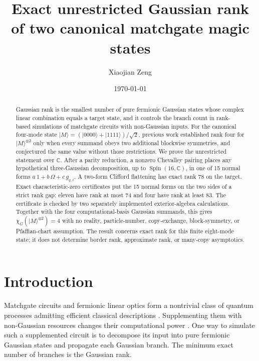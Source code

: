\documentclass[aps,pra,reprint,groupedaddress,nofootinbib,longbibliography]{revtex4-2}
\newcommand{\ket}[1]{\lvert #1\rangle}
\newcommand{\C}{\mathbb{C}}
\begin{document}
\title{Exact unrestricted Gaussian rank of two canonical matchgate magic states}

\author{Xiaojian Zeng}

\date{\today}

\begin{abstract}
Gaussian rank is the smallest number of pure fermionic Gaussian states whose
complex linear combination equals a target state, and it controls the branch
count in rank-based simulations of matchgate circuits with non-Gaussian inputs.
For the canonical four-mode state
$\ket{M}=(\ket{0000}+\ket{1111})/\sqrt{2}$, previous work established rank four
for $\ket{M}^{\otimes 2}$ only when every summand obeys two additional blockwise
symmetries, and conjectured the same value without those restrictions.  We prove
the unrestricted statement over $\C$.  After a parity reduction, a nonzero
Chevalley pairing places any hypothetical three-Gaussian decomposition, up to
$\operatorname{Spin}(16,\C)$, in one of 15 normal forms
$a\,1+b\,\Omega+c\,g_{q,i}$.  A two-form Clifford flattening has exact rank 78
on the target.  Exact characteristic-zero certificates put the 15 normal forms
on the two sides of a strict rank gap: eleven have rank at most 74 and four have
rank at least 83.  The certificate is checked by two separately implemented
exterior-algebra calculations.  Together with the four computational-basis
Gaussian summands, this gives $\chi_G(\ket{M}^{\otimes2})=4$ with no reality,
particle-number, copy-exchange, block-symmetry, or Pfaffian-chart assumption.
The result concerns exact rank for this finite eight-mode state; it does not
determine border rank, approximate rank, or many-copy asymptotics.
\end{abstract}

\maketitle

\section{Introduction}

Matchgate circuits and fermionic linear optics form a nontrivial class of quantum
processes admitting efficient classical descriptions
\cite{Valiant2002,TerhalDiVincenzo2002,Bravyi2005}.  Supplementing them with
non-Gaussian resources changes their computational power
\cite{BrodGalvao2011,Hebenstreit2019}.  One way to simulate such a supplemented
circuit is to decompose its input into pure fermionic Gaussian states and
propagate each Gaussian branch.  The minimum exact number of branches is the
Gaussian rank.
\end{document}
